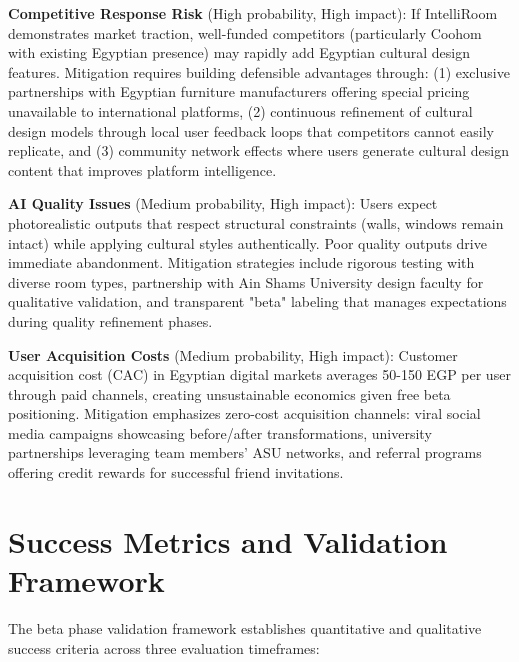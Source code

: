 \textbf{Competitive Response Risk} (High probability, High impact): If IntelliRoom demonstrates market traction, well-funded competitors (particularly Coohom with existing Egyptian presence) may rapidly add Egyptian cultural design features. Mitigation requires building defensible advantages through: (1) exclusive partnerships with Egyptian furniture manufacturers offering special pricing unavailable to international platforms, (2) continuous refinement of cultural design models through local user feedback loops that competitors cannot easily replicate, and (3) community network effects where users generate cultural design content that improves platform intelligence.

\textbf{AI Quality Issues} (Medium probability, High impact): Users expect photorealistic outputs that respect structural constraints (walls, windows remain intact) while applying cultural styles authentically. Poor quality outputs drive immediate abandonment. Mitigation strategies include rigorous testing with diverse room types, partnership with Ain Shams University design faculty for qualitative validation, and transparent "beta" labeling that manages expectations during quality refinement phases.

\textbf{User Acquisition Costs} (Medium probability, High impact): Customer acquisition cost (CAC) in Egyptian digital markets averages 50-150 EGP per user through paid channels, creating unsustainable economics given free beta positioning. Mitigation emphasizes zero-cost acquisition channels: viral social media campaigns showcasing before/after transformations, university partnerships leveraging team members' ASU networks, and referral programs offering credit rewards for successful friend invitations.

\section{Success Metrics and Validation Framework}
\label{sec:app_success_metrics}

The beta phase validation framework establishes quantitative and qualitative success criteria across three evaluation timeframes:

